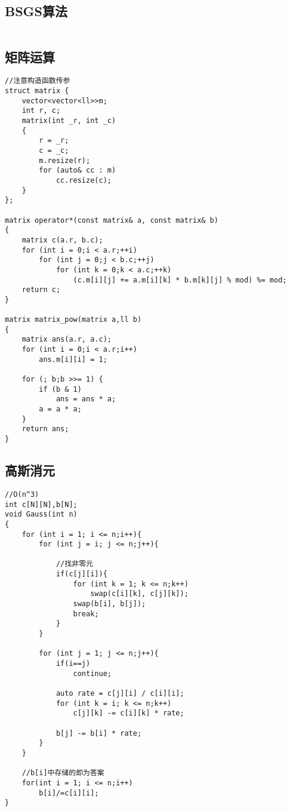 \documentclass[twocolumn,a4]{article}
\begin{document}
\subsection{BSGS算法}
\begin{lstlisting}

\end{lstlisting}

\subsection{矩阵运算}
\begin{lstlisting}
//注意构造函数传参
struct matrix {
    vector<vector<ll>>m;
    int r, c;
    matrix(int _r, int _c)
    {
        r = _r;
        c = _c;
        m.resize(r);
        for (auto& cc : m)
            cc.resize(c);
    }
};

matrix operator*(const matrix& a, const matrix& b)
{
    matrix c(a.r, b.c);
    for (int i = 0;i < a.r;++i)
        for (int j = 0;j < b.c;++j)
            for (int k = 0;k < a.c;++k)
                (c.m[i][j] += a.m[i][k] * b.m[k][j] % mod) %= mod;
    return c;
}

matrix matrix_pow(matrix a,ll b)
{
    matrix ans(a.r, a.c);
    for (int i = 0;i < a.r;i++)
        ans.m[i][i] = 1;

    for (; b;b >>= 1) {
        if (b & 1)
            ans = ans * a;
        a = a * a;
    }
    return ans;
}
\end{lstlisting}

\subsection{高斯消元}
\begin{lstlisting}
//O(n^3)
int c[N][N],b[N];
void Gauss(int n)
{
    for (int i = 1; i <= n;i++){
        for (int j = i; j <= n;j++){
            
            //找非零元
            if(c[j][i]){
                for (int k = 1; k <= n;k++)
                    swap(c[i][k], c[j][k]);
                swap(b[i], b[j]);
                break;
            }
        }

        for (int j = 1; j <= n;j++){
            if(i==j)
                continue;

            auto rate = c[j][i] / c[i][i];
            for (int k = i; k <= n;k++)
                c[j][k] -= c[i][k] * rate;

            b[j] -= b[i] * rate;
        }
    }
    
    //b[i]中存储的即为答案
    for(int i = 1; i <= n;i++)
        b[i]/=c[i][i];
}
\end{lstlisting}
\end{document}

